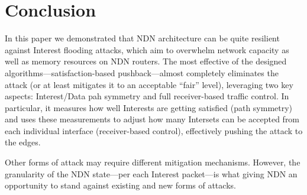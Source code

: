 \section{Conclusion}
\label{sec:conclusion}





In this paper we demonstrated that NDN architecture can be quite resilient against Interest flooding attacks, which aim to overwhelm network capacity as well as memory resources on NDN routers.
The most effective of the designed algorithms---satisfaction-based pushback---almost completely eliminates the attack (or at least mitigates it to an acceptable ``fair'' level), leveraging two key aspects: Interest/Data pah symmetry and full receiver-based traffic control.
In particular, it measures how well Interests are getting satisfied (path symmetry) and uses these measurements to adjust how many Intersets can be accepted from each individual interface (receiver-based control), effectively pushing the attack to the edges.

Other forms of attack may require different mitigation mechanisms.  
However, the granularity of the NDN state---per each Interest packet---is what giving NDN an opportunity to stand against existing and new forms of attacks.




